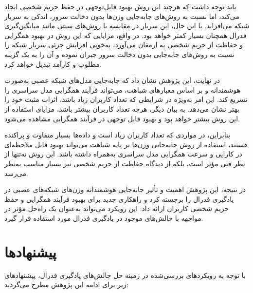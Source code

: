 باید توجه داشت که هرچند این روش بهبود قابل‌توجهی در حفظ حریم شخصی ایجاد می‌کند، اما نسبت به روش‌های جابه‌جایی وزن‌ها بدون دخالت سرور، اندکی به سربار شبکه می‌افزاید. با این حال، این سربار در مقایسه با روش‌های سنتی مانند میانگین‌گیری فدرال همچنان بسیار کمتر خواهد بود. در واقع، مزایایی که این روش در بهبود همگرایی و حفاظت از حریم شخصی به ارمغان می‌آورد، به‌خوبی افزایش جزئی سربار شبکه را نسبت به روش‌های جابه‌جایی بدون دخالت سرور جبران نموده و آن را به یک گزینه مطلوب و کارآمد تبدیل خواهد کرد.

در نهایت، این پژوهش نشان داد که جابه‌جایی مدل‌های شبکه عصبی به‌صورت هوشمندانه و بر اساس معیارهای شباهت، می‌تواند فرآیند همگرایی مدل سراسری را تسریع کند. این امر به‌ویژه در شرایطی که تعداد کاربران زیاد باشد، اثرات مثبت خود را بهتر نشان می‌دهد. به بیان دیگر، هرچه تعداد کاربران بیشتر باشد، مزایای استفاده از این روش بیشتر خواهد بود و بهبود قابل توجهی در فرآیند همگرایی مشاهده می‌شود.

بنابراین، در مواردی که تعداد کاربران زیاد است و داده‌ها بسیار متفاوت و پراکنده هستند، استفاده از روش‌ جابه‌جایی وزن‌ها بر پایه شباهت می‌تواند بهبود قابل ملاحظه‌ای در کارایی و سرعت همگرایی مدل سراسری به‌همراه داشته باشد. این روش نه‌تنها از نظر فنی مؤثر است، بلکه از دیدگاه حفاظت از حریم شخصی نیز بسیار مناسب به‌نظر می‌رسد.

در نتیجه، این پژوهش اهمیت و تأثیر جابه‌جایی هوشمندانه وزن‌های شبکه‌های عصبی در یادگیری فدرال را برجسته کرد و راهکاری جدید برای بهبود فرآیند همگرایی و حفظ حریم شخصی کاربران ارائه داد. این رویکرد می‌تواند به‌عنوان یک راه‌حل مؤثر در مواجهه با چالش‌های موجود در یادگیری فدرال مورد استفاده قرار گیرد.



\section{پیشنهادها}
با توجه به رویکردهای بررسی‌شده در زمینه حل چالش‌های یادگیری فدرال، پیشنهادهای زیر برای ادامه این پژوهش مطرح می‌گردند:

